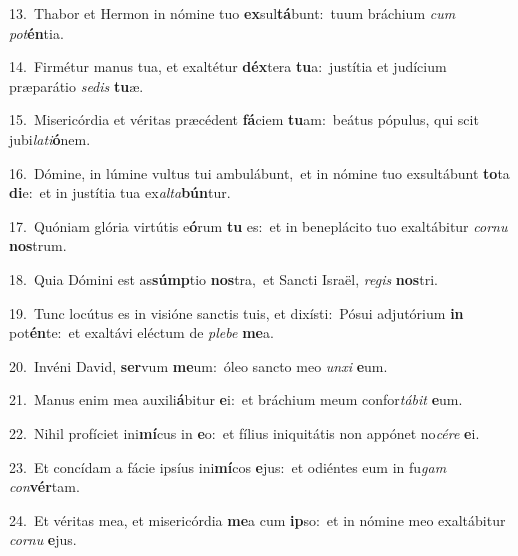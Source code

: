 {\numbfont\textcolor{\numbcolor}{13.}}~Thabor et Hermon in nómine tuo \textbf{ex}\-sul\-\textbf{tá}\-bunt:~\star tuum bráchium \textit{cum} \textit{pot}\-\textbf{én}tia.\par
{\numbfont\textcolor{\numbcolor}{14.}}~Firmétur manus tua, et exaltétur \textbf{déx}\-tera \textbf{tu}\-a:~\star justítia et judícium præparátio \textit{se}\-\textit{dis} \textbf{tu}\-æ.\par
{\numbfont\textcolor{\numbcolor}{15.}}~Misericórdia et véritas præcédent \textbf{fá}\-ciem \textbf{tu}\-am:~\star beátus pópulus, qui scit jubi\-\textit{la}\-\textit{ti}\textbf{ó}nem.\par
{\numbfont\textcolor{\numbcolor}{16.}}~Dómine, in lúmine vultus tui ambulábunt,~\dagger et in nómine tuo exsultábunt \textbf{to}\-ta \textbf{di}\-e:~\star et in justítia tua ex\-\textit{al}\-\textit{ta}\textbf{bún}tur.\par
{\numbfont\textcolor{\numbcolor}{17.}}~Quóniam glória virtútis e\-\textbf{ó}\-rum \textbf{tu} es:~\star et in beneplácito tuo exaltábitur \textit{cor}\-\textit{nu} \textbf{nos}\-trum.\par
{\numbfont\textcolor{\numbcolor}{18.}}~Quia Dómini est as\-\textbf{súmp}\-tio \textbf{nos}\-tra,~\star et Sancti Israël, \textit{re}\-\textit{gis} \textbf{nos}\-tri.\par
{\numbfont\textcolor{\numbcolor}{19.}}~Tunc locútus es in visióne sanctis tuis, et dixísti:~\dagger Pósui adjutórium \textbf{in} pot\-\textbf{én}\-te:~\star et exaltávi eléctum de \textit{ple}\-\textit{be} \textbf{me}\-a.\par
{\numbfont\textcolor{\numbcolor}{20.}}~Invéni David, \textbf{ser}\-vum \textbf{me}\-um:~\star óleo sancto meo \textit{un}\-\textit{xi} \textbf{e}\-um.\par
{\numbfont\textcolor{\numbcolor}{21.}}~Manus enim mea auxili\-\textbf{á}\-bitur \textbf{e}\-i:~\star et bráchium meum confor\-\textit{tá}\-\textit{bit} \textbf{e}\-um.\par
{\numbfont\textcolor{\numbcolor}{22.}}~Nihil profíciet ini\-\textbf{mí}\-cus in \textbf{e}\-o:~\star et fílius iniquitátis non appónet no\-\textit{cé}\-\textit{re} \textbf{e}\-i.\par
{\numbfont\textcolor{\numbcolor}{23.}}~Et concídam a fácie ipsíus ini\-\textbf{mí}\-cos \textbf{e}\-jus:~\star et odiéntes eum in fu\textit{gam} \textit{con}\-\textbf{vér}tam.\par
{\numbfont\textcolor{\numbcolor}{24.}}~Et véritas mea, et misericórdia \textbf{me}\-a cum \textbf{ip}\-so:~\star et in nómine meo exaltábitur \textit{cor}\-\textit{nu} \textbf{e}\-jus.\par
